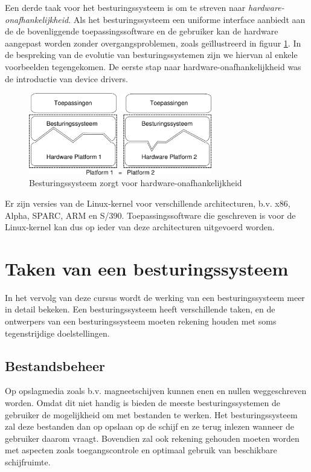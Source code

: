 Een derde taak voor het besturingssysteem is om te streven naar
\emph{hardware-onafhankelijkheid}. Als het
besturingssysteem een uniforme interface aanbiedt aan de de
bovenliggende toepassingssoftware en de gebruiker kan de hardware
aangepast worden zonder overgangsproblemen, zoals ge\"illustreerd in
figuur \ref{platform}. In de bespreking van de evolutie van
besturingssystemen zijn we hiervan al enkele voorbeelden tegengekomen.
De eerste stap naar hardware-onafhankelijkheid was de introductie
van device drivers.

\begin{figure}
\begin{center}
\includegraphics[width=80mm]{images/fig0102.png}
\end{center}
\caption{Besturingssysteem zorgt voor hardware-onafhankelijkheid}
\label{platform}
\end{figure}

Er zijn versies van de Linux-kernel voor verschillende
architecturen, b.v. x86, Alpha, SPARC, ARM en S/390. Toepassingssoftware
die geschreven is voor de Linux-kernel kan dus op ieder van deze
architecturen uitgevoerd worden.

\section{Taken van een besturingssysteem}

In het vervolg van deze cursus wordt de werking van een besturingssysteem
meer in detail bekeken. Een besturingssysteem heeft verschillende taken, en
de ontwerpers van een besturingssysteem moeten rekening houden met soms
tegenstrijdige doelstellingen.

\subsection{Bestandsbeheer}

Op opslagmedia zoals b.v. magneetschijven kunnen enen en nullen
weggeschreven worden. Omdat dit niet handig is bieden de meeste
besturingssystemen de gebruiker de mogelijkheid om met bestanden te
werken. Het besturingssysteem zal deze bestanden dan op opslaan op de
schijf en ze terug inlezen wanneer de gebruiker daarom vraagt.
Bovendien zal ook rekening gehouden moeten worden met aspecten zoals
toegangscontrole en optimaal gebruik van beschikbare
schijfruimte.

